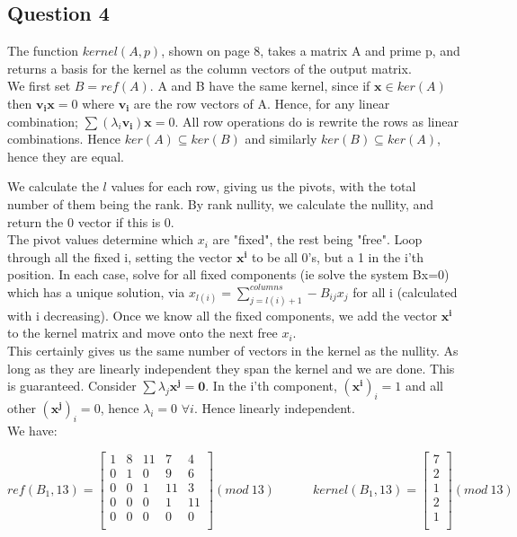 \documentclass[10pt,a4paper]{report}
\begin{document}
\subsection*{Question 4}
  
The function $kernel(A,p)$, shown on page 8, takes a matrix A and prime p, and returns a basis for the kernel as the column vectors of the output matrix.\\

We first set $B=ref(A)$. A and B have the same kernel, since if $\bm{x} \in ker(A)$ then $\bm{v_i}\bm{x}=0$ where $\bm{v_i}$ are the row vectors of A. Hence, for any linear combination; $\sum( \lambda_i \bm{v_i})\bm{x}=0$. All row operations do is rewrite the rows as linear combinations. Hence $ker(A)\subseteq ker(B)$ and similarly $ker(B)\subseteq ker(A)$, hence they are equal.

We calculate the $l$ values for each row, giving us the pivots, with the total number of them being the rank. By rank nullity, we calculate the nullity, and return the 0 vector if this is 0.\\

The pivot values determine which $x_i$ are "fixed", the rest being "free". Loop through all the fixed i, setting the vector $\bm{x^i}$ to be all 0's, but a 1 in the i'th position. In each case, solve for all fixed components (ie solve the system Bx=0) which has a unique solution, via $x_{l(i)}=\sum_{j=l(i)+1}^{columns} -B_{ij}x_j$ for all i (calculated with i decreasing). Once we know all the fixed components, we add the vector $\bm{x^i}$ to the kernel matrix and move onto the next free $x_i$.\\

This certainly gives us the same number of vectors in the kernel as the nullity. As long as they are linearly independent they span the kernel and we are done. This is guaranteed. Consider
$\sum\lambda_j \bm{x^j} =\bm{0}$. In the i'th component, $(\bm{x^i})_i=1$ and all other $(\bm{x^j})_i=0$, hence $\lambda_i=0$ $\forall i$. Hence linearly independent.\\


We have:

\vspace{5mm}

\begin{equation*}
ref(B_1,13)=\begin{bmatrix}
1 & 8 & 11 & 7 & 4 \\
0 & 1 & 0 & 9 & 6\\
0 & 0 & 1 & 11 & 3\\
0 & 0 & 0 & 1 & 11\\
0 & 0 & 0 & 0 & 0\\
\end{bmatrix} (mod \: 13)
\quad \quad \quad
kernel(B_1,13)=\begin{bmatrix}
7\\
2\\
1\\
2\\
1\\
\end{bmatrix} (mod \: 13)
\end{equation*}
\end{document}
